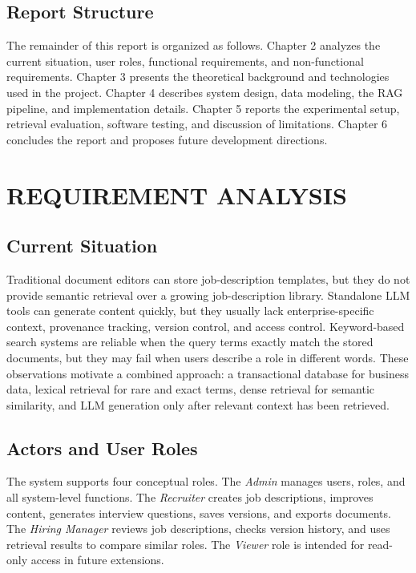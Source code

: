 \documentclass[12pt,a4paper,oneside]{report}
\begin{document}
\section{Report Structure}
The remainder of this report is organized as follows. Chapter 2 analyzes the current situation, user roles, functional requirements, and non-functional requirements. Chapter 3 presents the theoretical background and technologies used in the project. Chapter 4 describes system design, data modeling, the RAG pipeline, and implementation details. Chapter 5 reports the experimental setup, retrieval evaluation, software testing, and discussion of limitations. Chapter 6 concludes the report and proposes future development directions.

\chapter{REQUIREMENT ANALYSIS}

\section{Current Situation}
Traditional document editors can store job-description templates, but they do not provide semantic retrieval over a growing job-description library. Standalone LLM tools can generate content quickly, but they usually lack enterprise-specific context, provenance tracking, version control, and access control. Keyword-based search systems are reliable when the query terms exactly match the stored documents, but they may fail when users describe a role in different words. These observations motivate a combined approach: a transactional database for business data, lexical retrieval for rare and exact terms, dense retrieval for semantic similarity, and LLM generation only after relevant context has been retrieved.

\section{Actors and User Roles}
The system supports four conceptual roles. The \textit{Admin} manages users, roles, and all system-level functions. The \textit{Recruiter} creates job descriptions, improves content, generates interview questions, saves versions, and exports documents. The \textit{Hiring Manager} reviews job descriptions, checks version history, and uses retrieval results to compare similar roles. The \textit{Viewer} role is intended for read-only access in future extensions.
\end{document}
